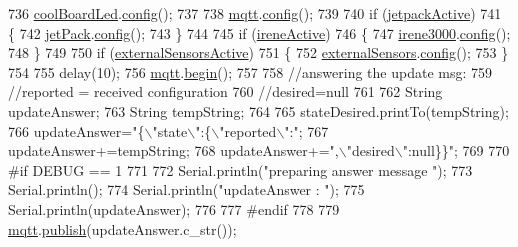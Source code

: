 \begin{DoxyCode}
736             \hyperlink{classCoolBoard_a1b1d3c684a5baa56b08486e192fd8e97}{coolBoardLed}.\hyperlink{classCoolBoardLed_a1b60e5e30bea96c49ed62ed1bf1ffc8b}{config}();
737 
738             \hyperlink{classCoolBoard_a2399f44d7c23c1149a335cb3b46d90f1}{mqtt}.\hyperlink{classCoolMQTT_a9b703de4f1358f0ee7a5e8c44979c648}{config}();
739 
740             \textcolor{keywordflow}{if} (\hyperlink{classCoolBoard_a9be03a913d26e558328935ca3b59a75e}{jetpackActive})
741             \{
742                 \hyperlink{classCoolBoard_a30b1357881b01ccbec676856a91e48e9}{jetPack}.\hyperlink{classJetpack_ab065ee83e244265a2223a22f3ee4a719}{config}();
743             \}
744 
745             \textcolor{keywordflow}{if} (\hyperlink{classCoolBoard_a9c3f7ac625481ee2ae802a25d97a4ae0}{ireneActive})
746             \{
747                 \hyperlink{classCoolBoard_ad103718ce316006c4695b8eb312eaf11}{irene3000}.\hyperlink{classIrene3000_afed5c35e4b23963c157847ef27c11e9c}{config}();
748             \}
749 
750             \textcolor{keywordflow}{if} (\hyperlink{classCoolBoard_a638b00b76aeb819ecfd4c10b8cdd7bb7}{externalSensorsActive})
751             \{
752                 \hyperlink{classCoolBoard_a09e26264839c65873eb56af476eff6b2}{externalSensors}.\hyperlink{classExternalSensors_a862a4bd11346b37270d0244c2adabe5a}{config}();
753             \}
754 
755             delay(10);
756             \hyperlink{classCoolBoard_a2399f44d7c23c1149a335cb3b46d90f1}{mqtt}.\hyperlink{classCoolMQTT_ac9248808641ebf3054ed0620ea9d0100}{begin}();
757 
758                 \textcolor{comment}{//answering the update msg:}
759             \textcolor{comment}{//reported = received configuration}
760             \textcolor{comment}{//desired=null}
761         
762             String updateAnswer;
763             String tempString;
764             
765             stateDesired.printTo(tempString);
766             updateAnswer=\textcolor{stringliteral}{"\{\(\backslash\)"state\(\backslash\)":\{\(\backslash\)"reported\(\backslash\)":"};
767             updateAnswer+=tempString;
768             updateAnswer+=\textcolor{stringliteral}{",\(\backslash\)"desired\(\backslash\)":null\}\}"};
769 
770 \textcolor{preprocessor}{        #if DEBUG == 1}
771 
772             Serial.println(\textcolor{stringliteral}{"preparing answer message "});
773             Serial.println();
774             Serial.println(\textcolor{stringliteral}{"updateAnswer : "});
775             Serial.println(updateAnswer);
776         
777 \textcolor{preprocessor}{        #endif  }
778 
779             \hyperlink{classCoolBoard_a2399f44d7c23c1149a335cb3b46d90f1}{mqtt}.\hyperlink{classCoolMQTT_ace977b3e90ab14b1199fe5c4fb0a13ec}{publish}(updateAnswer.c\_str());

\end{DoxyCode}
